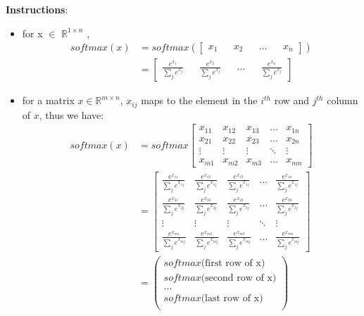 {\textbf {Instructions}}:
\begin{itemize}
\item for  x $\in$ $\mathbb{R}^{1\times n}$ , 
\begin{equation}
\begin{aligned}
softmax(x) &= softmax(\begin{bmatrix}
    x_1  &&
    x_2 &&
    ...  &&
    x_n  
\end{bmatrix}) \\
&= \begin{bmatrix}
     \frac{e^{x_1}}{\sum_{j}e^{x_j}}  &&
    \frac{e^{x_2}}{\sum_{j}e^{x_j}}  &&
    ...  &&
    \frac{e^{x_n}}{\sum_{j}e^{x_j}} 
\end{bmatrix} 
\end{aligned}
\end{equation}
\item for a matrix $ x \in \mathbb{R}^{m \times n} $,  $x_{ij}$ maps to the element in the $i^{th}$ row and $j^{th}$ column of $x$, thus we have: 
\begin{equation}
\begin{aligned}
softmax(x) &= softmax\begin{bmatrix}
    x_{11} & x_{12} & x_{13} & \dots  & x_{1n} \\
    x_{21} & x_{22} & x_{23} & \dots  & x_{2n} \\
    \vdots & \vdots & \vdots & \ddots & \vdots \\
    x_{m1} & x_{m2} & x_{m3} & \dots  & x_{mn}
\end{bmatrix} \\
&= \begin{bmatrix}
    \frac{e^{x_{11}}}{\sum_{j}e^{x_{1j}}} & \frac{e^{x_{12}}}{\sum_{j}e^{x_{1j}}} & \frac{e^{x_{13}}}{\sum_{j}e^{x_{1j}}} & \dots  & \frac{e^{x_{1n}}}{\sum_{j}e^{x_{1j}}} \\
    \frac{e^{x_{21}}}{\sum_{j}e^{x_{2j}}} & \frac{e^{x_{22}}}{\sum_{j}e^{x_{2j}}} & \frac{e^{x_{23}}}{\sum_{j}e^{x_{2j}}} & \dots  & \frac{e^{x_{2n}}}{\sum_{j}e^{x_{2j}}} \\
    \vdots & \vdots & \vdots & \ddots & \vdots \\
    \frac{e^{x_{m1}}}{\sum_{j}e^{x_{mj}}} & \frac{e^{x_{m2}}}{\sum_{j}e^{x_{mj}}} & \frac{e^{x_{m3}}}{\sum_{j}e^{x_{mj}}} & \dots  & \frac{e^{x_{mn}}}{\sum_{j}e^{x_{mj}}}
\end{bmatrix} \\
&= \begin{pmatrix}
    softmax\text{(first row of x)}  \\
    softmax\text{(second row of x)} \\
    ...  \\
    softmax\text{(last row of x)} \\
\end{pmatrix}
\end{aligned}
\end{equation}
\end{itemize}


